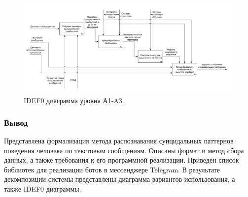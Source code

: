 \begin{figure}[H]
	\centering
	\includegraphics[width=\textwidth]{inc/A1.pdf}
	\caption{ IDEF0 диаграмма уровня А1-A3. }
	\label{img:idef1}
\end{figure}

\subsubsection*{Вывод}

Представлена формализация метода распознавания суицидальных паттернов поведения человека по текстовым сообщениям. Описаны формат и метод сбора данных, а также требования к его программной реализации. Приведен список библиотек для реализации ботов в мессенджере Telegram. В результате декомпозиции системы представлены диаграмма вариантов использования, а также IDEF0 диаграммы.

\pagebreak